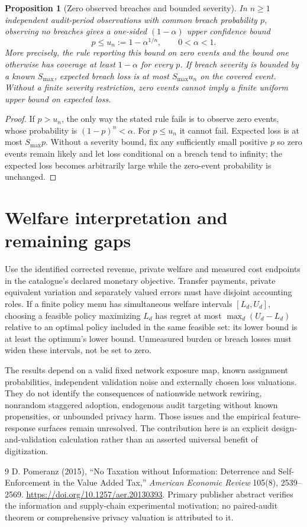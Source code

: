 \documentclass[11pt,a4paper]{article}
\newtheorem{proposition}[theorem]{Proposition}
\theoremstyle{definition}
\theoremstyle{remark}
\begin{document}
\begin{proposition}[Zero observed breaches and bounded severity]
In $n\geq1$ independent audit-period observations with common breach probability $p$, observing no breaches gives a one-sided $(1-\alpha)$ upper confidence bound
\[
 p\leq u_n:=1-\alpha^{1/n},\qquad 0<\alpha<1.
\]
More precisely, the rule reporting this bound on zero events and the bound one otherwise has coverage at least $1-\alpha$ for every $p$. If breach severity is bounded by a known $S_{\max}$, expected breach loss is at most $S_{\max}u_n$ on the covered event. Without a finite severity restriction, zero events cannot imply a finite uniform upper bound on expected loss.
\end{proposition}
\begin{proof}
If $p>u_n$, the only way the stated rule fails is to observe zero events, whose probability is $(1-p)^n<\alpha$. For $p\leq u_n$ it cannot fail. Expected loss is at most $S_{\max}p$. Without a severity bound, fix any sufficiently small positive $p$ so zero events remain likely and let loss conditional on a breach tend to infinity; the expected loss becomes arbitrarily large while the zero-event probability is unchanged.
\end{proof}

\section{Welfare interpretation and remaining gaps}
Use the identified corrected revenue, private welfare and measured cost endpoints in the catalogue's declared monetary objective. Transfer payments, private equivalent variation and separately valued errors must have disjoint accounting roles. If a finite policy menu has simultaneous welfare intervals $[L_d,U_d]$, choosing a feasible policy maximizing $L_d$ has regret at most $\max_d(U_d-L_d)$ relative to an optimal policy included in the same feasible set: its lower bound is at least the optimum's lower bound. Unmeasured burden or breach losses must widen these intervals, not be set to zero.

The results depend on a valid fixed network exposure map, known assignment probabilities, independent validation noise and externally chosen loss valuations. They do not identify the consequences of nationwide network rewiring, nonrandom staggered adoption, endogenous audit targeting without known propensities, or unbounded privacy harm. Those issues and the empirical feature-response surfaces remain unresolved. The contribution here is an explicit design-and-validation calculation rather than an asserted universal benefit of digitization.

\begin{thebibliography}{9}
 D. Pomeranz (2015), ``No Taxation without Information: Deterrence and Self-Enforcement in the Value Added Tax,'' \emph{American Economic Review} 105(8), 2539--2569. \url{https://doi.org/10.1257/aer.20130393}. Primary publisher abstract verifies the information and supply-chain experimental motivation; no paired-audit theorem or comprehensive privacy valuation is attributed to it.
\end{thebibliography}
\end{document}
